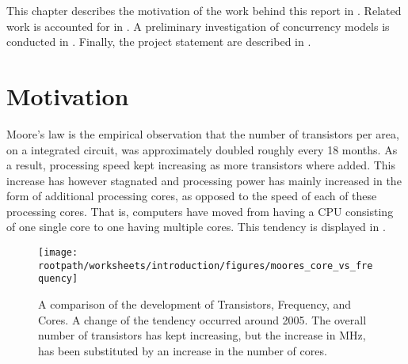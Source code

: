 \makeatletter {}\makeatother
{}
This chapter describes the motivation of the work behind this report in . Related work is accounted for in . A preliminary investigation of concurrency models is conducted in . Finally, the project statement are described in .
\label{chap:intro}

\section{Motivation}
Moore's law\cite{moore1965cramming} is the empirical observation that the number of transistors per area, on a integrated circuit, was approximately doubled roughly every 18 months\cite[p. 203]{mack2011fifty}. As a result, processing speed kept increasing as more transistors where added. This increase has however stagnated and processing power has mainly increased in the form of additional processing cores, as opposed to the speed of each of these processing cores\cite[p. 22]{sevenModels}. That is, computers have moved from having a \ac{CPU} consisting of one single core to one having multiple cores. This tendency is displayed in . 
\label{sec:motivation}

\begin{figure}[htbp]
\centering
 \texttt{[image: \\rootpath/worksheets/introduction/figures/moores\_core\_vs\_frequency]} 
 \caption{A comparison of the development of Transistors, Frequency, and Cores\cite{isca2009}. A change of the tendency occurred around 2005. The overall number of transistors has kept increasing, but the increase in MHz, has been substituted by an increase in the number of cores.}
\label{fig:moores_in_reality}
\end{figure}

